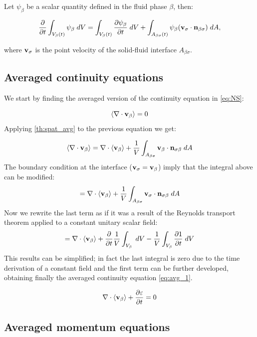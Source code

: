\begin{theorem}
	Let $\psi_{\beta}$ be a scalar quantity defined in the fluid phase $\beta$, then:
	
	\begin{equation}
	\dfrac{\partial}{\partial t} \int_{V_\beta(t)} \psi_{\beta} \; dV =  \int_{V_\beta(t)} \dfrac{\partial \psi_{\beta}}{\partial t} \; dV + \int_{A_{\beta \sigma}(t)} \psi_{\beta} (\textbf{v}_{\sigma} \cdot \mathbf{n}_{\beta \sigma} ) \;dA,
	\label{th:transport}
	\end{equation}
	
	where $\textbf{v}_{\sigma}$ is the point velocity of the solid-fluid interface $A_{\beta \sigma}$.
\end{theorem}


\subsection{Averaged continuity equations}


We start by finding the averaged version of the continuity equation in \eqref{eq:NS}:

\begin{equation}
{\left< \nabla \cdot \textbf{v}_{\beta}\right>}   = 0
\label{eq:superf_avg_cont}
\end{equation}
Applying \ref{th:spat_avg} to the previous equation we get:

$$
{\left< \nabla \cdot \textbf{v}_{\beta} \right>} = \nabla \cdot {\left< \textbf{v}_{\beta}\right>} + \dfrac{1}{V} \int_{A_{\beta \sigma}}  \textbf{v}_{\beta} \cdot \mathbf{n}_{\sigma \beta} \;dA
$$
The boundary condition at the interface ($\textbf{v}_{\sigma} = \textbf{v}_{\beta}$) imply that the integral above can be modified: 
$$=\nabla \cdot {\left< \textbf{v}_{\beta}\right>} + \dfrac{1}{V} \int_{A_{\beta \sigma}}  \textbf{v}_{\sigma} \cdot \mathbf{n}_{\sigma \beta} \;dA$$
Now we rewrite the last term as if it was a result of the Reynolds transport theorem applied to a constant unitary scalar field:
$$=\nabla \cdot {\left< \textbf{v}_{\beta}\right>} + \dfrac{\partial }{\partial t} \dfrac{1}{V} \int_{V_\beta} \;dV  - \dfrac{1}{V} \int_{V_\beta} \dfrac{\partial 1}{\partial t} \;dV $$
This results can be simplified; in fact the last integral is zero due to the time derivation of a constant field and the first term can be further developed, obtaining finally the averaged continuity equation \eqref{eq:avg_1}.

\begin{equation}
\nabla \cdot {\left< \textbf{v}_{\beta}\right>} + \dfrac{\partial \varepsilon}{\partial t} =0
\label{eq:avg_1}
\end{equation}


\subsection{Averaged momentum equations}


